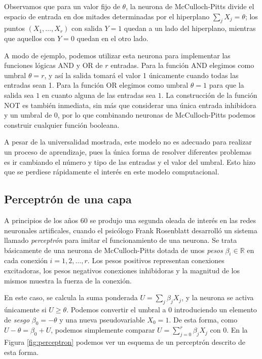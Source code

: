 \documentclass[
  a4paper,
  12pt,
  spanish,
]{scrartcl}
\theoremstyle{teorema-style}
\begin{document}
Observamos que para un valor fijo de $\theta$, la neurona de McCulloch-Pitts divide el espacio de entrada en dos mitades determinadas por el hiperplano $\sum_j X_j = \theta$; los puntos $(X_1, \dots, X_r)$ con salida $Y=1$ quedan a un lado del hiperplano, mientras que aquellos con $Y=0$ quedan en el otro lado.

A modo de ejemplo, podemos utilizar esta neurona para implementar las funciones lógicas AND y OR de $r$ entradas. Para la función AND elegimos como umbral $\theta = r$, y así la salida tomará el valor 1 únicamente cuando todas las entradas sean 1. Para la función OR elegimos como umbral $\theta = 1$ para que la salida sea $1$ en cuanto alguna de las entradas sea $1$. La construcción de la función NOT es también inmediata, sin más que considerar una única entrada inhibidora y un umbral de $0$, por lo que combinando neuronas de McCulloch-Pitts podemos construir cualquier función booleana.

A pesar de la universalidad mostrada, este modelo no es adecuado para realizar un proceso de aprendizaje, pues la única forma de resolver diferentes problemas es ir cambiando el número y tipo de las entradas y el valor del umbral. Esto hizo que se perdiese rápidamente el interés en este modelo computacional.

\subsection{Perceptrón de una capa}

A principios de los años 60 se produjo una segunda oleada de interés en las redes neuronales artificales, cuando el psicólogo Frank Rosenblatt desarrolló un sistema llamado \textit{perceptrón} \parencite{rosenblatt_perceptron_1958} para imitar el funcionamiento de una neurona. Se trata básicamente de una neurona de McCulloch-Pitts dotada de unos \textit{pesos} $\beta_i \in \mathbb{R}$ en cada conexión $i=1,2,\dots, r$. Los pesos positivos representan conexiones excitadoras, los pesos negativos conexiones inhibidoras y la magnitud de los mismos muestra la fuerza de la conexión.

En este caso, se calcula la suma ponderada $U=\sum_j \beta_j X_j$, y la neurona se activa únicamente si $U\ge \theta$. Podemos convertir el umbral a $0$ introduciendo un elemento de \textit{sesgo} $\beta_0 = -\theta$ y una nueva pseudovariable $X_0 = 1$. De esta forma, como $U-\theta = \beta_0 + U$, podemos simplemente comparar $U=\sum_{j=0}^r \beta_j X_j$ con $0$. En la Figura \ref{fig:perceptron} podemos ver un esquema de un perceptrón descrito de esta forma.
\end{document}
